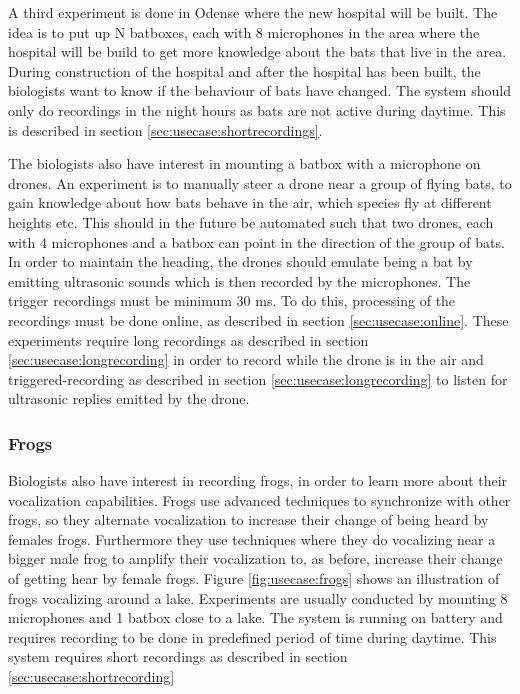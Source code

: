 A third experiment is done in Odense where the new hospital will be built.
The idea is to put up N batboxes, each with 8 microphones in the area where the hospital will be build to get more knowledge about the bats that live in the area. During construction of the hospital and after the hospital has been built, the biologists want to know if the behaviour of bats have changed. The system should only do recordings in the night hours as bats are not active during daytime. This is described in section \ref{sec:usecase:shortrecordings}.


The biologists also have interest in mounting a batbox with a microphone on drones. An experiment is to manually steer a drone near a group of flying bats, to gain knowledge about how bats behave in the air, which species fly at different heights etc. This should in the future be automated such that two drones, each with 4 microphones and a batbox can point in the direction of the group of bats.
In order to maintain the heading, the drones should emulate being a bat by emitting ultrasonic sounds which is then recorded by the microphones. The trigger recordings must be minimum 30 ms. To do this, processing of the recordings must be done online, as described in section \ref{sec:usecase:online}.
These experiments require long recordings as described in section \ref{sec:usecase:longrecording} in order to record while the drone is in the air and triggered-recording as described in section \ref{sec:usecase:longrecording} to listen for ultrasonic replies emitted by the drone.

\subsubsection{Frogs} \label{sec:usecase:frogs}
Biologists also have interest in recording frogs, in order to learn more about their vocalization capabilities. Frogs use advanced techniques to synchronize with other frogs, so they alternate vocalization to increase their change of being heard by females frogs. Furthermore they use techniques where they do vocalizing near a bigger male frog to amplify their vocalization to, as before, increase their change of getting hear by female frogs. Figure \ref{fig:usecase:frogs} shows an illustration of frogs vocalizing around a lake. Experiments are usually conducted by mounting 8 microphones and 1 batbox close to a lake. The system is running on battery and requires recording to be done in predefined period of time during daytime. This system requires short recordings as described in section \ref{sec:usecase:shortrecording}

